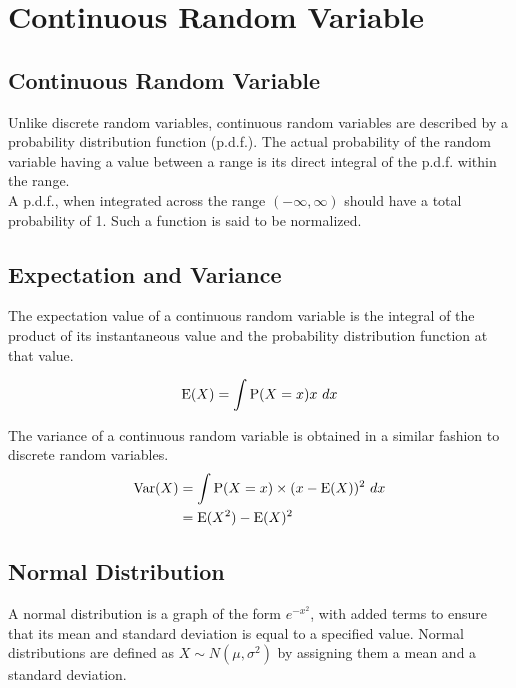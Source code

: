 \documentclass[../main]{subfiles}
\begin{document}
\section{Continuous Random Variable}

	\subsection{Continuous Random Variable}

	Unlike discrete random variables, continuous random variables are described by a probability distribution function (p.d.f.). The actual probability of the random variable having a value between a range is its direct integral of the p.d.f. within the range. \\

	A p.d.f., when integrated across the range \((-\infty,\infty)\) should have a total probability of 1. Such a function is said to be normalized. \\

	\subsection{Expectation and Variance}

	The expectation value of a continuous random variable is the integral of the product of its instantaneous value and the probability distribution function at that value.

 	\[ \operatorname{E}(X) = \int \operatorname{P}(X=x) x ~ dx\]

 	The variance of a continuous random variable is obtained in a similar fashion to discrete random variables. \\

 	\begin{equation*} \begin{aligned}
		\operatorname{Var}(X) & = \int \operatorname{P}(X=x) \times (x - \operatorname{E}(X))^2 ~ dx \\
				& = \operatorname{E}(X^2) - \operatorname{E}(X)^2
	\end{aligned} \end{equation*}

	\subsection{Normal Distribution}

	A normal distribution is a graph of the form \(e^{-x^2}\), with added terms to ensure that its mean and standard deviation is equal to a specified value. Normal distributions are defined as \(X\sim N(\mu,\sigma^2)\) by assigning them a mean and a standard deviation. \\
\end{document}
